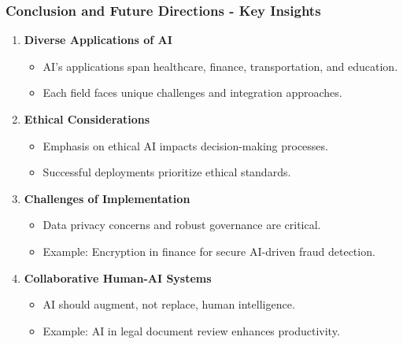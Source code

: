 \documentclass[aspectratio=169]{beamer}
\begin{document}
\begin{frame}[fragile]
    \frametitle{Conclusion and Future Directions - Key Insights}
    \begin{enumerate}
        \item \textbf{Diverse Applications of AI} 
            \begin{itemize}
                \item AI's applications span healthcare, finance, transportation, and education.
                \item Each field faces unique challenges and integration approaches.
            \end{itemize}
        
        \item \textbf{Ethical Considerations}
            \begin{itemize}
                \item Emphasis on ethical AI impacts decision-making processes.
                \item Successful deployments prioritize ethical standards.
            \end{itemize}

        \item \textbf{Challenges of Implementation}
            \begin{itemize}
                \item Data privacy concerns and robust governance are critical.
                \item Example: Encryption in finance for secure AI-driven fraud detection.
            \end{itemize}

        \item \textbf{Collaborative Human-AI Systems}
            \begin{itemize}
                \item AI should augment, not replace, human intelligence.
                \item Example: AI in legal document review enhances productivity.
            \end{itemize}
    \end{enumerate}
\end{frame}
\end{document}
